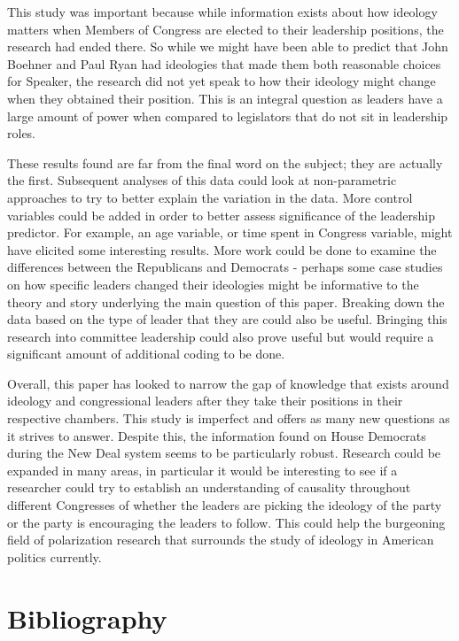 \documentclass[12pt,twoside]{reedthesis}
\begin{document}
  This study was important because while information exists about how
  ideology matters when Members of Congress are elected to their
  leadership positions, the research had ended there. So while we might
  have been able to predict that John Boehner and Paul Ryan had ideologies
  that made them both reasonable choices for Speaker, the research did not
  yet speak to how their ideology might change when they obtained their
  position. This is an integral question as leaders have a large amount of
  power when compared to legislators that do not sit in leadership roles.
  
  These results found are far from the final word on the subject; they are
  actually the first. Subsequent analyses of this data could look at
  non-parametric approaches to try to better explain the variation in the
  data. More control variables could be added in order to better assess
  significance of the leadership predictor. For example, an age variable,
  or time spent in Congress variable, might have elicited some interesting
  results. More work could be done to examine the differences between the
  Republicans and Democrats - perhaps some case studies on how specific
  leaders changed their ideologies might be informative to the theory and
  story underlying the main question of this paper. Breaking down the data
  based on the type of leader that they are could also be useful. Bringing
  this research into committee leadership could also prove useful but
  would require a significant amount of additional coding to be done.
  
  Overall, this paper has looked to narrow the gap of knowledge that
  exists around ideology and congressional leaders after they take their
  positions in their respective chambers. This study is imperfect and
  offers as many new questions as it strives to answer. Despite this, the
  information found on House Democrats during the New Deal system seems to
  be particularly robust. Research could be expanded in many areas, in
  particular it would be interesting to see if a researcher could try to
  establish an understanding of causality throughout different Congresses
  of whether the leaders are picking the ideology of the party or the
  party is encouraging the leaders to follow. This could help the
  burgeoning field of polarization research that surrounds the study of
  ideology in American politics currently.
  
  \backmatter
  
  \chapter{Bibliography}\label{bibliography}
  
\end{document}

